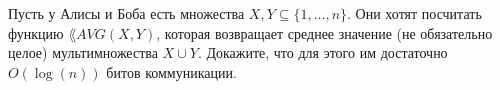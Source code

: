 Пусть у Алисы и Боба есть множества $X, Y \subseteq \{1, \dots, n\}$. Они хотят посчитать функцию $\lang{AVG}(X, Y)$, которая
возвращает среднее значение (не обязательно целое) мультимножества $X \cup Y$. Докажите, что для этого им достаточно
$O(\log(n))$ битов коммуникации.